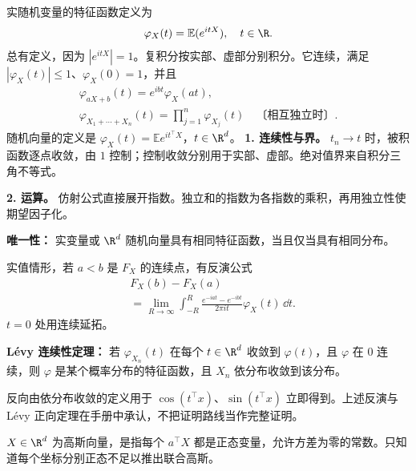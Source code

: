 实随机变量的特征函数定义为
\[
\varphi_X(t)=\mathbb E(e^{itX}),\quad t\in\R.
\]
总有定义，因为 $|e^{itX}|=1$。复积分按实部、虚部分别积分。它连续，满足 $|\varphi_X(t)|\le1$、$\varphi_X(0)=1$，并且
\[
\begin{gathered}
\varphi_{aX+b}(t)=e^{ibt}\varphi_X(at),\\
\varphi_{X_1+\cdots+X_n}(t)
=\prod_{j=1}^n\varphi_{X_j}(t)
\quad\text{〔相互独立时〕}.
\end{gathered}
\]
随机向量的定义是 $\varphi_X(t)=\mathbb E e^{it^\top X}$，$t\in\R^d$。
\textbf{1. 连续性与界。} $t_n\to t$ 时，被积函数逐点收敛，由 $1$ 控制；控制收敛分别用于实部、虚部。绝对值界来自积分三角不等式。

\textbf{2. 运算。} 仿射公式直接展开指数。独立和的指数为各指数的乘积，再用独立性使期望因子化。

\textbf{唯一性：} 实变量或 $\R^d$ 随机向量具有相同特征函数，当且仅当具有相同分布。

实值情形，若 $a<b$ 是 $F_X$ 的连续点，有反演公式
\[
\begin{aligned}
&F_X(b)-F_X(a)\\
&=\lim_{R\to\infty}
\int_{-R}^{R}
\frac{e^{-iat}-e^{-ibt}}{2\pi it}\varphi_X(t)\,\dd t.
\end{aligned}
\]
$t=0$ 处用连续延拓。

\textbf{Lévy 连续性定理：} 若 $\varphi_{X_n}(t)$ 在每个 $t\in\R^d$ 收敛到 $\varphi(t)$，且 $\varphi$ 在 $0$ 连续，则 $\varphi$ 是某个概率分布的特征函数，且 $X_n$ 依分布收敛到该分布。

反向由依分布收敛的定义用于 $\cos(t^\top x)$、$\sin(t^\top x)$ 立即得到。上述反演与 Lévy 正向定理在手册中承认，不把证明路线当作完整证明。

$X\in\R^d$ 为高斯向量，是指每个 $a^\top X$ 都是正态变量，允许方差为零的常数。只知道每个坐标分别正态不足以推出联合高斯。

